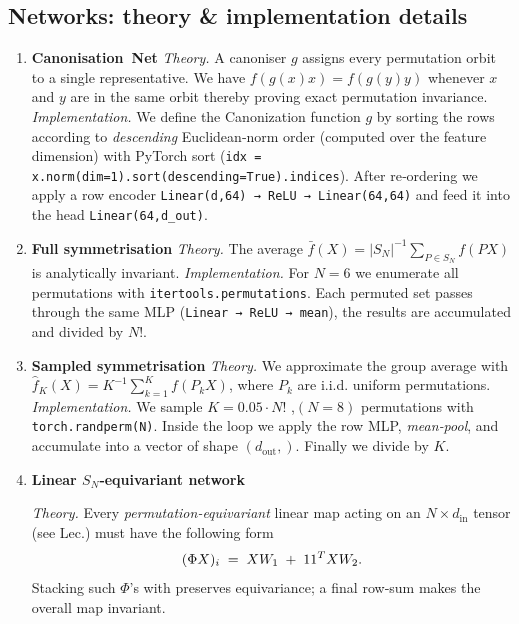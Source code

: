 \subsection{Networks: theory \& implementation details}
\begin{enumerate}[label=(\alph*),wide,labelindent=0pt]	
	\item \textbf{Canonisation Net}
	\textit{Theory.}  
	A canoniser \(g\) assigns every permutation orbit to a single representative.
	We have
	$f(g(x)x) = f(g(y)y)$ whenever $x$ and $y$ are in the same orbit thereby proving exact permutation invariance.
%
	\textit{Implementation.}  
	We define the Canonization function \(g\) by sorting the rows according to \emph{descending} Euclidean‑norm order (computed over the feature
	dimension) with PyTorch sort
	(\texttt{idx = x.norm(dim=1).sort(descending=True).indices}).  
	After re‑ordering we apply a row encoder
	\texttt{Linear(d,64) → ReLU → Linear(64,64)}
	and feed it into the head \texttt{Linear(64,d\_out)}.
%	
	\item \textbf{Full symmetrisation}
%	
	\textit{Theory.}  
	The average
	\(\bar f(X)=|S_N|^{-1}\sum_{P\in S_N} f (PX) \) is analytically invariant.
%	
	\textit{Implementation.}  
	For \(N\! = \!6\) we enumerate all permutations with
	\texttt{itertools.permutations}.  
	Each permuted set passes through the same MLP
	(\texttt{Linear → ReLU → mean}), the results are accumulated and divided by \(N!\).
%	
	\item \textbf{Sampled symmetrisation}
%	
	\textit{Theory.}  
	We approximate the group average with
	\(\hat f_K(X)=K^{-1}\sum_{k=1}^K f(P_kX)\), where \(P_k\) are i.i.d. uniform
	permutations.
%	
	\textit{Implementation.}  
	We sample \(K=0.05 \cdot N!\) ,$(N=8)$ permutations  with
	\texttt{torch.randperm(N)}.  
	Inside the loop we apply the row MLP, \emph{mean‑pool}, and accumulate into a
	vector of shape \((d_{\text{out}},)\).  
	Finally we divide by \(K\).
%	
	\item \textbf{Linear \(S_N\)‑equivariant network}
	
	\textit{Theory.}  
	Every \emph{permutation‑equivariant} linear map
	acting on an \(N\times d_{\text{in}}\) tensor (see Lec.)
	must have the following form
	\[ \label{eq:equivariance}
	(\Phi X)_i \;=\;
	X W_1 \;+\;
	\boldmath{1} \boldmath{1}^T X W_2  .
	\]
	Stacking such \(\Phi\)’s with preserves equivariance; a final
	row‑sum makes the overall map invariant.
	

\end{enumerate}
